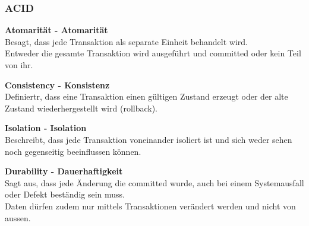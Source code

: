 
\subsubsection{ACID}
\label{subsubsec:acid}
    \begin{description}
        \item \textbf{Atomarität - Atomarität}\hfill \\Besagt, dass jede \Gls{Transaktion} als separate Einheit behandelt wird.\\Entweder die gesamte Transaktion wird ausgeführt und committed oder kein Teil von ihr.
        \item \textbf{Consistency - Konsistenz}\hfill \\Definiertr, dass eine \Gls{Transaktion} einen gültigen Zustand erzeugt oder der alte Zustand wiederhergestellt wird (rollback).
        \item \textbf{Isolation - Isolation}\hfill \\Beschreibt, dass jede Transaktion voneinander isoliert ist und sich weder sehen noch gegenseitig beeinflussen können.
        \item \textbf{Durability - Dauerhaftigkeit}\hfill \\Sagt aus, dass jede Änderung die committed wurde, auch bei einem Systemausfall oder Defekt beständig sein muss.\\Daten dürfen zudem nur mittels Transaktionen verändert werden und nicht von aussen.
    \end{description}
